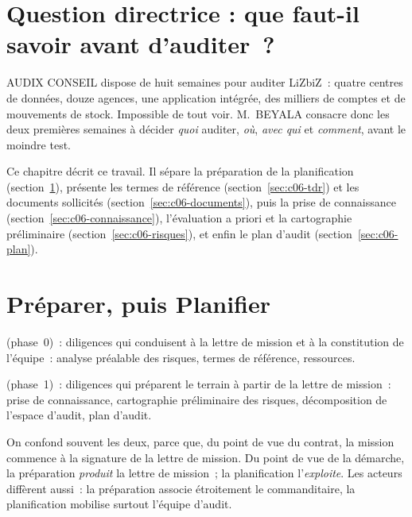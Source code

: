 \bigskip

\section*{Question directrice : que faut-il savoir avant d'auditer~?}

AUDIX CONSEIL dispose de huit semaines pour auditer LiZbiZ~: quatre
centres de données, douze agences, une application intégrée, des milliers
de comptes et de mouvements de stock. Impossible de tout voir. M.~BEYALA
consacre donc les deux premières semaines à décider \emph{quoi} auditer,
\emph{où}, \emph{avec qui} et \emph{comment}, avant le moindre test.

Ce chapitre décrit ce travail. Il sépare la préparation de la
planification (section~\ref{sec:c06-deux-phases}), présente les termes de
référence (section~\ref{sec:c06-tdr}) et les documents sollicités
(section~\ref{sec:c06-documents}), puis la prise de connaissance
(section~\ref{sec:c06-connaissance}), l'évaluation a priori et la
cartographie préliminaire (section~\ref{sec:c06-risques}), et enfin le plan
d'audit (section~\ref{sec:c06-plan}).

\separateur

\section{Préparer, puis Planifier}
\label{sec:c06-deux-phases}

\begin{boxdef}
 (phase~0)~:
diligences qui conduisent à la lettre de mission et à la constitution de
l'équipe~: analyse préalable des risques, termes de référence, ressources.

\medskip
{} (phase~1)~: diligences qui
préparent le terrain à partir de la lettre de mission~: prise de
connaissance, cartographie préliminaire des risques, décomposition de
l'espace d'audit, plan d'audit.
\end{boxdef}

On confond souvent les deux, parce que, du point de vue du contrat, la
mission commence à la signature de la lettre de mission. Du point de vue de
la démarche, la préparation \emph{produit} la lettre de mission~; la
planification l'\emph{exploite}. Les acteurs diffèrent aussi~: la
préparation associe étroitement le commanditaire, la planification
mobilise surtout l'équipe d'audit.

